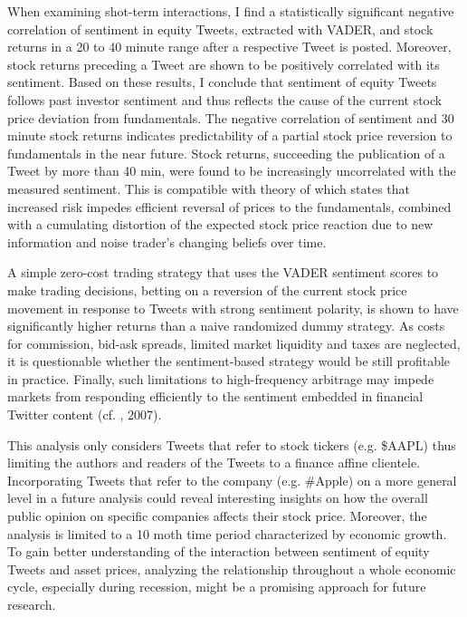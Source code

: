 \documentclass[a4paper,12pt]{article}%
\begin{document}
When examining shot-term interactions, I find a statistically significant negative correlation of sentiment in equity Tweets, extracted with VADER, and stock returns in a 20 to 40 minute range after a respective Tweet is posted. Moreover, stock returns preceding a Tweet are shown to be positively correlated with its sentiment. Based on these results, I conclude that sentiment of equity Tweets follows past investor sentiment and thus reflects the cause of the current stock price deviation from fundamentals. The negative correlation of sentiment and 30 minute stock returns indicates predictability of a partial stock price reversion to fundamentals in the near future.
Stock returns, succeeding the publication of a Tweet by more than 40 min, were found to be increasingly uncorrelated with the measured sentiment. This is compatible with theory of \citet{DeLong1990} which states that increased risk impedes efficient reversal of prices to the fundamentals, combined with a cumulating distortion of the expected stock price reaction due to new information and noise trader's changing beliefs over time.

A simple zero-cost trading strategy that uses the VADER sentiment scores to make trading decisions, betting on a reversion of the current stock price movement in response to Tweets with strong sentiment polarity, is shown to have significantly higher returns than a naive randomized dummy strategy. As costs for commission, bid-ask spreads, limited market liquidity and taxes are neglected, it is questionable whether the sentiment-based strategy would be still profitable in practice. Finally, such limitations to high-frequency arbitrage may impede markets from responding efficiently to the sentiment embedded in financial Twitter content (cf. \citeauthor{Tetlock2007}, 2007).

This analysis only considers Tweets that refer to stock tickers (e.g. \$AAPL) thus limiting the authors and readers of the Tweets to a finance affine clientele. Incorporating Tweets that refer to the company (e.g. \#Apple) on a more general level in a future analysis could reveal interesting insights on how the overall public opinion on specific companies affects their stock price. Moreover, the analysis is limited to a 10 moth time period characterized by economic growth. To gain better understanding of the interaction between sentiment of equity Tweets and asset prices, analyzing the relationship throughout a whole economic cycle, especially during recession, might be a promising approach for future research.
\end{document}
